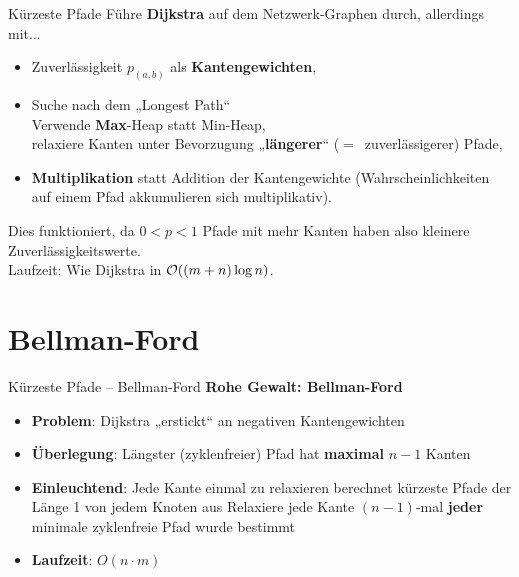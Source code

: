 \begin{frame}{Kürzeste Pfade}
	\solutionheading
	Führe \textbf{Dijkstra} auf dem Netzwerk-Graphen durch, allerdings mit...
	\begin{itemize}
		\item Zuverlässigkeit $p_{(a,b)}$ als \textbf{Kantengewichten},
		\item Suche nach dem „Longest Path“ \\
		\impl Verwende \textbf{Max}-Heap statt Min-Heap, \\
		\impl relaxiere Kanten unter Bevorzugung „\textbf{längerer}“ {\small ($=$~zuverlässigerer)} Pfade,
		\item \textbf{Multiplikation} statt Addition der Kantengewichte (Wahrscheinlichkeiten auf einem Pfad akkumulieren sich multiplikativ).
	\end{itemize}
	\pause
	Dies funktioniert, da $ 0 < p < 1$ \impl Pfade mit mehr Kanten haben also kleinere Zuverlässigkeitswerte. \\
	\pause
	\smallskip
	Laufzeit: Wie Dijkstra in $\mathcal{O}\!\left((m+n) \log n\right)$.
\end{frame}

\section{Bellman-Ford}

\begin{frame}{Kürzeste Pfade – Bellman-Ford}
	\textbf{Rohe Gewalt: Bellman-Ford} 
	\begin{itemize}
		\item \textbf{Problem}: Dijkstra „erstickt“ an negativen Kantengewichten
		\pause
		\item \textbf{Überlegung}: Längster (zyklenfreier) Pfad hat \textbf{maximal} $n-1$ Kanten
		\item \textbf{Einleuchtend}: Jede Kante einmal zu relaxieren berechnet kürzeste Pfade der Länge 1 von jedem Knoten aus
		\pause
		\implitem Relaxiere jede Kante $(n-1)$-mal \impl \textbf{jeder} minimale zyklenfreie Pfad wurde bestimmt
		\pause
		\item \textbf{Laufzeit}: $O(n \cdot m)$
	\end{itemize}
\end{frame}

